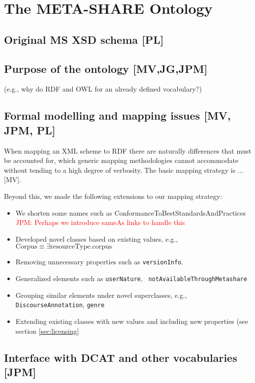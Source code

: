\documentclass{llncs}
\begin{document}
\section{The META-SHARE Ontology}
\label{sec:ontology}

\subsection{Original MS XSD schema [PL]}
\label{sec:xsd}

\subsection{Purpose of the ontology [MV,JG,JPM]}
\label{sec:purpose}
(e.g., why do RDF and OWL for an already defined vocabulary?) 
\subsection{Formal modelling and mapping issues [MV, JPM, PL]}

When mapping an XML scheme to RDF there are naturally differences that must be
accounted for, which generic mapping methodologies cannot accommodate without
tending to a high degree of verbosity. The basic mapping strategy is ... [MV]. 

Beyond this, we made the following extensions to our mapping strategy:

\begin{itemize}
    \item We shorten some names such as ConformanceToBestStandardsAndPractices
        \textcolor{red}{JPM: Perhaps we introduce sameAs links to handle this}
    \item Developed novel classes based on existing values, e.g.,
        $\mathrm{Corpus} \equiv \exists \mathrm{resourceType}.\mathrm{corpus}$
    \item Removing unnecessary properties such as {\tt versionInfo}.
    \item Generalized elements such as {\tt userNature}, {\tt
        notAvailableThroughMetashare}
    \item Grouping similar elements under novel superclasses, e.g., {\tt
        DiscourseAnnotation}, {\tt genre}
    \item Extending existing classes with new values and including new
        properties (see section \ref{sec:licensing}
\end{itemize}

\subsection{Interface with DCAT and other vocabularies [JPM]}
\label{sec:dcat}
\end{document}
